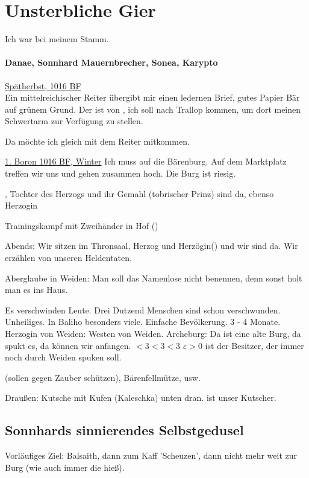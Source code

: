 \section{Unsterbliche Gier}
Ich war bei meinem Stamm. 
\paragraph{Danae, Sonnhard Mauernbrecher, Sonea, Karypto}
\underline{Spätherbst, 1016 BF}\\
Ein mittelreichischer Reiter übergibt mir einen ledernen Brief, gutes Papier Bär auf grünem Grund. Der ist von , ich soll nach Trallop kommen, um dort meinen Schwertarm zur Verfügung zu stellen. 

Da möchte ich gleich mit dem Reiter mitkommen. 

\underline{1. Boron 1016 BF, Winter}
Ich muss auf die Bärenburg. Auf dem Marktplatz treffen wir uns und gehen zusammen hoch. Die Burg ist riesig. 

, Tochter des Herzogs und ihr Gemahl  (tobrischer Prinz) sind da, ebenso Herzogin 

Trainingskampf mit Zweihänder in Hof () 

Abends: Wir sitzen im Thronsaal, Herzog und Herzögin() und wir sind da. Wir erzählen von unseren Heldentaten.

Aberglaube in Weiden: Man soll das Namenlose nicht benennen, denn sonst holt man es ins Haus.

Es verschwinden Leute. Drei Dutzend Menschen sind schon verschwunden. Unheiliges. In Baliho besonders viele. Einfache Bevölkerung. 3 - 4 Monate. Herzogin von Weiden: Westen von Weiden. Archeburg: Da ist eine alte Burg, da spukt es, da können wir anfangen. $<3 <3 <3$ $\varepsilon>0$  ist der Besitzer, der immer noch durch Weiden spuken soll. 

(sollen gegen Zauber schützen), Bärenfellmütze, usw.

Draußen: Kutsche mit Kufen (Kaleschka) unten dran.  ist unser Kutscher.


\subsection{Sonnhards sinnierendes Selbstgedusel}
Vorläufiges Ziel: Balsaith, dann zum Kaff 'Scheuzen', dann nicht mehr weit zur Burg (wie auch immer die hieß).

